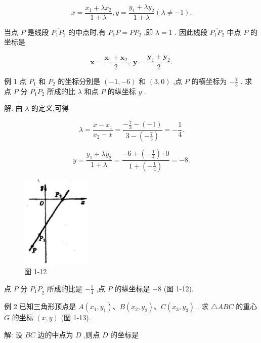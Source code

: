 \documentclass[lang=cn,newtx,10pt,scheme=chinese]{elegantbook}
\begin{document}
\[
  x = \frac{{x}_{1} + \lambda {x}_{2}}{1 + \lambda },y = \frac{{y}_{1} + \lambda {y}_{2}}{1 + \lambda }\left( {\lambda \neq - 1}\right) .
\]

当点 \(P\) 是线段 \(\overline{{P}_{1}{P}_{2}}\) 的中点时,有 \({P}_{1}P = P{P}_{2}\) ,即 \(\lambda = 1\) . 因此线段 \(\overline{{P}_{1}{P}_{2}}\) 中点 \(P\) 的坐标是

\[
  \mathbf{x} = \frac{{\mathbf{x}}_{1} + {\mathbf{x}}_{2}}{2},\;\mathbf{y} = \frac{{\mathbf{y}}_{1} + {\mathbf{y}}_{2}}{2}.
\]

例 1 点 \({P}_{1}\) 和 \({P}_{2}\) 的坐标分别是 \(\left( {-1, - 6}\right)\) 和 \(\left( {3,0}\right)\) ,点 \(P\) 的横坐标为 \(- \frac{7}{3}\) . 求点 \(P\) 分 \(\overline{{P}_{1}{P}_{2}}\) 所成的比 \(\lambda\) 和点 \(P\) 的纵坐标 \(y\) .

解: 由 \(\lambda\) 的定义,可得

\[
  \lambda = \frac{x - {x}_{1}}{{x}_{2} - x} = \frac{-\frac{7}{3} - \left( {-1}\right) }{3 - \left( {-\frac{7}{3}}\right) } = - \frac{1}{4}.
\]

\[
  y = \frac{{y}_{1} + \lambda {y}_{2}}{1 + \lambda } = \frac{-6 + \left( {-\frac{1}{4}}\right) \cdot 0}{1 + \left( {-\frac{1}{4}}\right) } = - 8.
\]

\begin{figure}[h]
  \centering
  \includegraphics[max width=0.3\textwidth]{images/01912cc2-ffb6-728e-9ae7-b113ff05c64b_14_690449.jpg}
  \caption{图 1-12}
\end{figure}



点 \(P\) 分 \({\overline{{P}_{1}P}}_{2}\) 所成的比是 \(- \frac{1}{4}\) ,点 \(P\) 的纵坐标是 \(- 8\) (图 1-12).

例 2 已知三角形顶点是 \(A\left( {{x}_{1},{y}_{1}}\right) \text{、}B\left( {{x}_{2},{y}_{2}}\right) \text{、}C\left( {{x}_{3},{y}_{3}}\right)\) . 求 \(\bigtriangleup {ABC}\) 的重心 \(G\) 的坐标 \(\left( {x,y}\right)\) (图 1-13).

解: 设 \({BC}\) 边的中点为 \(D\) ,则点 \(D\) 的坐标是
\end{document}
